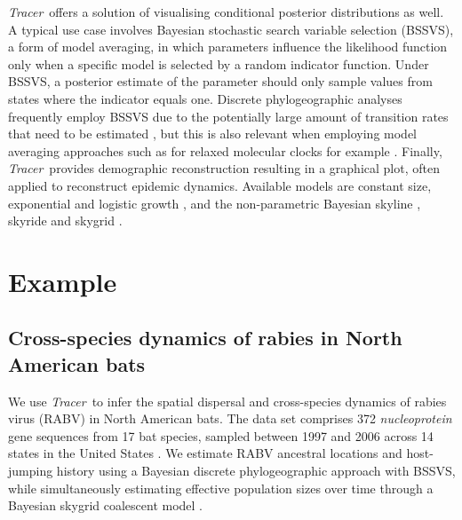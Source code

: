 \documentclass{bioinfo_tracer}
\newcommand{\tracer}{\emph{Tracer}}
\begin{document}
\tracer\ offers a solution of visualising conditional posterior distributions as well.
A typical use case involves Bayesian stochastic search variable selection (BSSVS), a form of model averaging, in which parameters influence the likelihood function only when a specific model is selected by a random indicator function.
Under BSSVS, a posterior estimate of the parameter should only sample values from states where the indicator equals one.
Discrete phylogeographic analyses frequently employ BSSVS due to the potentially large amount of transition rates that need to be estimated \citep{Lemey2009}, but this is also relevant when employing model averaging approaches such as for relaxed molecular clocks for example \citep{Li2012}.
%
Finally, \tracer\ provides demographic reconstruction resulting in a graphical plot, often applied to reconstruct epidemic dynamics.
Available models are constant size, exponential and logistic growth \citep{drummond2002estimating},
and the non-parametric Bayesian skyline \citep{drummond2005bayesian,heledDrummond2008}, skyride \citep{minin2008smooth} and skygrid \citep{gill2012improving}.

\vspace{-0.5cm}

\section*{Example}

\subsection*{Cross-species dynamics of rabies in North American bats}

We use \tracer\ to infer the spatial dispersal and cross-species dynamics of rabies virus (RABV) in North American bats.
The data set comprises 372 \textit{nucleoprotein} gene sequences from 17 bat species, sampled between 1997 and 2006 across 14 states in the United States \citep{Streicker,Faria2013}.
We estimate RABV ancestral locations and host-jumping history using a Bayesian discrete phylogeographic approach with BSSVS, while simultaneously estimating effective population sizes over time through a Bayesian skygrid coalescent model \citep{gill2012improving}.
\end{document}

